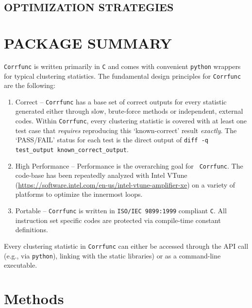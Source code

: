 \documentclass[preprint, 12pt, authoryear]{elsarticle}
\newcommand{\corrfunc}{{\tt Corrfunc}\xspace}
\begin{document}
\subsection{OPTIMIZATION STRATEGIES}

\section{PACKAGE SUMMARY}
\corrfunc is written primarily in {\tt C} and comes with convenient
{\tt python} wrappers for typical clustering statistics. The fundamental design
principles for \corrfunc are the following:
\begin{enumerate}
  \item Correct -- \corrfunc has a base set of correct outputs for every statistic
    generated either through slow, brute-force methods or independent, 
    external codes. Within \corrfunc, every clustering statistic is covered with at least one
    test case that {\em requires} reproducing this `known-correct' result {\em
      exactly}. The `PASS/FAIL' status for each test is the direct output of {\tt diff -q
      test\_output known\_correct\_output}.  
  \item High Performance -- Performance is the overarching goal for {\tt
    Corrfunc}. The code-base has been repeatedly analyzed with Intel VTune
    (\url{https://software.intel.com/en-us/intel-vtune-amplifier-xe})
    on a variety of platforms to optimize the innermost loops. 
  \item Portable -- \corrfunc is written in {\tt ISO/IEC 9899:1999}
    compliant {\tt C}. All instruction set specific codes are protected via compile-time constant
    definitions.
\end{enumerate}
Every clustering statistic in \corrfunc can either be accessed through the
API call (e.g., via {\tt python}), linking with the static libraries) or as
a command-line executable. 

\section{Methods}
\end{document}
